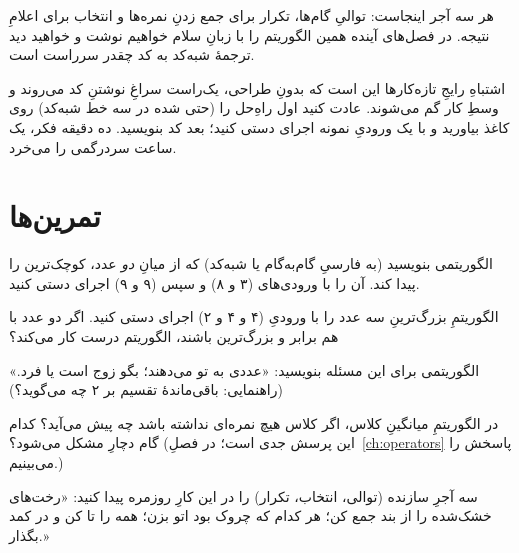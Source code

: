 هر سه آجر اینجاست: توالیِ گام‌ها، تکرار برای جمع زدنِ نمره‌ها و انتخاب برای
اعلامِ نتیجه. در فصل‌های آینده همین الگوریتم را با زبانِ سلام خواهیم نوشت و
خواهید دید ترجمهٔ شبه‌کد به کد چقدر سرراست است.

\begin{warn}
اشتباهِ رایجِ تازه‌کارها این است که بدونِ طراحی، یک‌راست سراغِ نوشتنِ کد
می‌روند و وسطِ کار گم می‌شوند. عادت کنید اول راهِ‌حل را (حتی شده در سه خط
شبه‌کد) روی کاغذ بیاورید و با یک ورودیِ نمونه اجرای دستی کنید؛ بعد کد
بنویسید. ده دقیقه فکر، یک ساعت سردرگمی را می‌خرد.
\end{warn}

\section{تمرین‌ها}

\exercise الگوریتمی بنویسید (به فارسیِ گام‌به‌گام یا شبه‌کد) که از میانِ
\emph{دو} عدد، کوچک‌ترین را پیدا کند. آن را با ورودی‌های (۳ و ۸) و سپس (۹ و
۹) اجرای دستی کنید.

\exercise الگوریتمِ بزرگ‌ترینِ سه عدد را با ورودیِ (۴ و ۴ و ۲) اجرای دستی
کنید. اگر دو عدد با هم برابر و بزرگ‌ترین باشند، الگوریتم درست کار می‌کند؟

\exercise الگوریتمی برای این مسئله بنویسید: «عددی به تو می‌دهند؛ بگو زوج
است یا فرد.» (راهنمایی: باقی‌ماندهٔ تقسیم بر ۲ چه می‌گوید؟)

\exercise در الگوریتمِ میانگینِ کلاس، اگر کلاس هیچ نمره‌ای نداشته باشد چه
پیش می‌آید؟ کدام گام دچارِ مشکل می‌شود؟ (این پرسش جدی است؛ در فصلِ~\ref{ch:operators} پاسخش را می‌بینیم.)

\exercise سه آجرِ سازنده (توالی، انتخاب، تکرار) را در این کارِ روزمره پیدا
کنید: «رخت‌های خشک‌شده را از بند جمع کن؛ هر کدام که چروک بود اتو بزن؛ همه را
تا کن و در کمد بگذار.»
